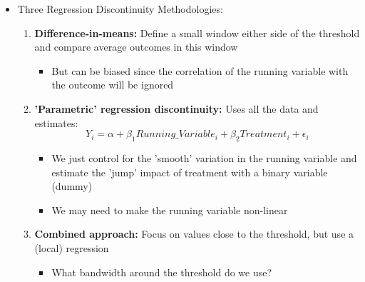 \documentclass[xcolor=x11names,compress]{beamer}\usepackage[]{graphicx}\usepackage[]{color}
\renewcommand{\(}{\begin{columns}}
\renewcommand{\)}{\end{columns}}
\newcommand{\<}[1]{\begin{column}{#1}}
\renewcommand{\>}{\end{column}}
\begin{document}
\begin{frame}
\begin{itemize}
\item Three Regression Discontinuity Methodologies:
\begin{enumerate}
\item \textbf{Difference-in-means:} Define a small window either side of the threshold and compare average outcomes in this window
\begin{itemize}
\item But can be biased since the correlation of the running variable with the outcome will be ignored
\pause
\end{itemize}
\item \textbf{'Parametric' regression discontinuity:} Uses all the data and estimates:
$$Y_i = \alpha + \beta_1 Running\_Variable_i + \beta_2 Treatment_i + \epsilon_i$$
\begin{itemize}
\item We just control for the 'smooth' variation in the running variable and estimate the 'jump' impact of treatment with a binary variable (dummy)
\item We may need to make the running variable non-linear
\pause
\end{itemize}
\item \textbf{Combined approach:} Focus on values close to the threshold, but use a (local) regression
\begin{itemize}
\item What bandwidth around the threshold do we use?
\end{itemize}
\end{enumerate}
\end{itemize}
\end{frame}
\end{document}
